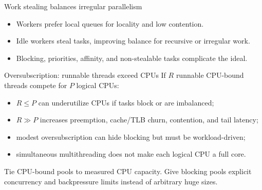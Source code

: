 \documentclass[aspectratio=169,11pt]{beamer}
\begin{document}
\begin{frame}{Work stealing balances irregular parallelism}
  \begin{center}
  \end{center}
  \begin{itemize}
    \item Workers prefer local queues for locality and low contention.
    \item Idle workers steal tasks, improving balance for recursive or irregular work.
    \item Blocking, priorities, affinity, and non-stealable tasks complicate the ideal.
  \end{itemize}
\end{frame}

\begin{frame}{Oversubscription: runnable threads exceed CPUs}
  If $R$ runnable CPU-bound threads compete for $P$ logical CPUs:
  \begin{itemize}
    \item $R\le P$ can underutilize CPUs if tasks block or are imbalanced;
    \item $R\gg P$ increases preemption, cache/TLB churn, contention, and tail latency;
    \item modest oversubscription can hide blocking but must be workload-driven;
    \item simultaneous multithreading does not make each logical CPU a full core.
  \end{itemize}
  \begin{tcolorbox}[title=Sizing principle,colback=osgreen!5,colframe=osgreen!70]
    Tie CPU-bound pools to measured CPU capacity. Give blocking pools explicit concurrency and backpressure limits instead of arbitrary huge sizes.
  \end{tcolorbox}
\end{frame}
\end{document}
